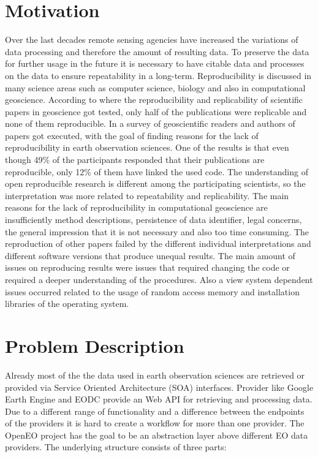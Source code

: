\documentclass[draft,final]{vutinfth} %
\begin{document}
\section{Motivation}\label{Motivation}
Over the last decades remote sensing agencies have increased the variations of data processing and therefore the amount of resulting data. To preserve the data for further usage in the future it is necessary to have citable data and processes on the data to ensure repeatability in a long-term.\cite{6352411} Reproducibility is discussed in many science areas such as computer science, biology and also in computational geoscience. According to \cite{Ostermann2017AdvancingSW} where the reproducibility and replicability of scientific papers in geoscience got tested, only half of the publications were replicable and none of them reproducible. In \cite{Thestateofreproducibility} a survey of geoscientific readers and authors of papers got executed, with the goal of finding reasons for the lack of reproducibility in earth observation sciences. One of the results is that even though 49\% of the participants responded that their publications are reproducible, only 12\% of them have linked the used code. The understanding of open reproducible research is different among the participating scientists, so the interpretation was more related to repeatability and replicability. The main reasons for the lack of reproducibility in computational geoscience are insufficiently method descriptions, persistence of data identifier, legal concerns, the general impression that it is not necessary and also too time consuming. 
The reproduction of other papers failed by the different individual interpretations and different software versions that produce unequal results. The main amount of issues on reproducing results were issues that required changing the code or required a deeper understanding of the procedures. Also a view system dependent issues occurred related to the usage of random access memory and installation libraries of the operating system. \cite{Thestateofreproducibility}

\section{Problem Description}\label{Problem}
Already most of the the data used in earth observation sciences are retrieved or provided via Service Oriented Architecture (SOA) interfaces. Provider like Google Earth Engine and EODC provide an Web API for retrieving and processing data. Due to a different range of functionality and a difference between the endpoints of the providers it is hard to create a workflow for more than one provider. The OpenEO project has the goal to be an abstraction layer above different EO data providers. The underlying structure consists of three parts:
\end{document}
